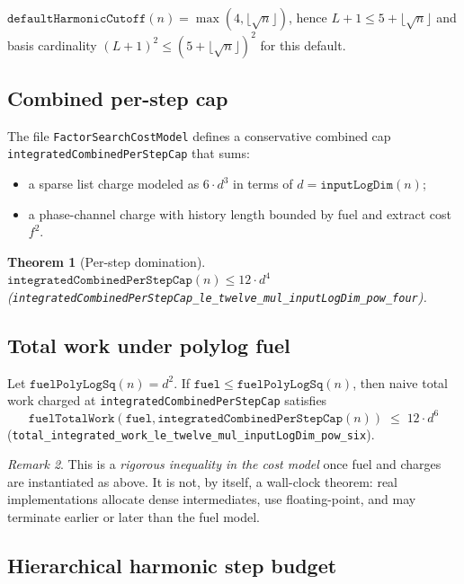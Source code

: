 \documentclass[11pt,a4paper]{article}
\theoremstyle{plain}
\newtheorem{theorem}{Theorem}[section]
\theoremstyle{definition}
\theoremstyle{remark}
\newtheorem{remark}[theorem]{Remark}
\begin{document}
$\texttt{defaultHarmonicCutoff}(n) = \max(4,\lfloor\sqrt{n}\rfloor)$, hence
$L+1 \le 5+\lfloor\sqrt{n}\rfloor$ and basis cardinality $(L+1)^2 \le (5+\lfloor\sqrt{n}\rfloor)^2$
for this default.

\subsection{Combined per-step cap}

The file \texttt{FactorSearchCostModel} defines a conservative combined cap
\texttt{integratedCombinedPerStepCap} that sums:
\begin{itemize}
\item a sparse list charge modeled as $6\cdot d^3$ in terms of $d=\texttt{inputLogDim}(n)$;
\item a phase-channel charge with history length bounded by fuel and extract cost $f^2$.
\end{itemize}

\begin{theorem}[Per-step domination]
$\texttt{integratedCombinedPerStepCap}(n) \le 12 \cdot d^4$
(\texttt{integratedCombinedPerStepCap\_le\_twelve\_mul\_inputLogDim\_pow\_four}).
\end{theorem}

\subsection{Total work under polylog fuel}

Let $\texttt{fuelPolyLogSq}(n) = d^2$. If $\texttt{fuel} \le \texttt{fuelPolyLogSq}(n)$,
then naive total work charged at \texttt{integratedCombinedPerStepCap} satisfies
\[
\texttt{fuelTotalWork}(\texttt{fuel},\texttt{integratedCombinedPerStepCap}(n))
\;\le\; 12 \cdot d^6
\]
(\texttt{total\_integrated\_work\_le\_twelve\_mul\_inputLogDim\_pow\_six}).

\begin{remark}
This is a \emph{rigorous inequality in the cost model} once fuel and charges are
instantiated as above. It is not, by itself, a wall-clock theorem: real implementations
allocate dense intermediates, use floating-point, and may terminate earlier or later
than the fuel model.
\end{remark}

\subsection{Hierarchical harmonic step budget}
\end{document}
